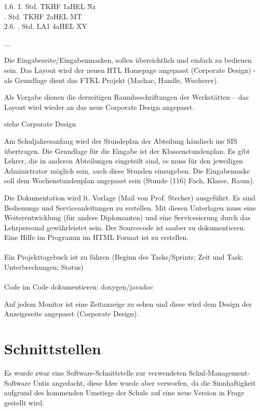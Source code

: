 \begin{description}[style=nextline]
\begin{tabbing}
1.6. \= 1. Std. \= TKHF \= 1aHEL \hspace{2em} \= Nz\\
 . Std. \> TKHF \> 2aHEL \> MT\\
2.6. . Std. \> LA1 \> 4aHEL \> XY
\end{tabbing}
		...
	\item[Layout]
		Die Eingabeseite/Eingabenmasken, sollen übersichtlich und einfach zu bedienen sein. Das Layout wird der neuen HTL Homepage angepasst (Corporate Design) - als Grundlage dient das FTKL Projekt (Machac, Handle, Wucherer).\\
		\begin{description}[style=nextline]
			\item[Stundenplandesign]
				Als Vorgabe dienen die derzeitigen Raumbeschriftungen der Werkstätten – das Layout wird wieder an das neue Corporate Design angepasst.
			\item[App­Design]
				siehe Corporate Design
			\item[Stundenplaneingabe]
				Am Schuljahresanfang wird der Stundeplan der Abteilung händisch ins SIS übertragen. Die Grundlage für die Eingabe ist der Klassenstundenplan. Es gibt Lehrer, die in anderen Abteilungen eingeteilt sind, es muss für den jeweiligen Administrator möglich sein, auch diese Stunden einzugeben. Die Eingabemaske soll dem Wochenstundenplan angepasst sein (Stunde (1­16) Fach, Klasse, Raum).
			\item[Dokumentation]
				Die Dokumentation wird lt. Vorlage (Mail von Prof. Stecher) ausgeführt. Es sind Bedienungs­ und Serviceanleitungen zu erstellen. Mit diesen Unterlagen muss eine Weiterentwicklung (für andere Diplomanten) und eine Servicesierung durch das Lehrpersonal gewährleistet sein. Der Sourcecode ist sauber zu dokumentieren. Eine Hilfe im Programm im HTML Format ist zu erstellen.\\
				\\
				Ein Projekttagebuch ist zu führen (Beginn des Tasks/Sprints; Zeit und Task; Unterbrechungen; Status)\\
				\\
				Code im Code dokumentieren: doxygen/javadoc
		\end{description}
	\item[Uhranzeige]
		Auf jedem Monitor ist eine Zeitanzeige zu sehen und diese wird dem Design der Anzeigeseite angepasst (Corporate Design).
\end{description}

\section{Schnittstellen}
Es wurde zwar eine Software-Schnittstelle zur verwendeten Schul-Management-Software Untis angedacht, diese Idee wurde aber verworfen, da die Sinnhaftigkeit aufgrund des kommenden Umstiegs der Schule auf eine neue Version in Frage gestellt wird.

